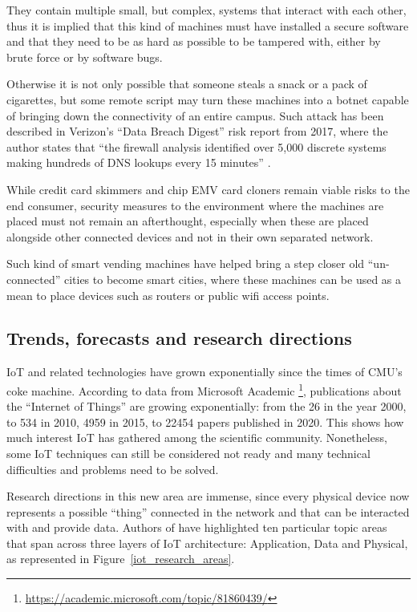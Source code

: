 			They contain multiple small, but complex, systems that interact with each other, thus it is implied that this kind of machines must have installed a secure software and that they need to be as hard as possible to be tampered with, either by brute force or by software bugs.
				
			Otherwise it is not only possible that someone steals a snack or a pack of cigarettes, but some remote script may turn these machines into a botnet capable of bringing down the connectivity of an entire campus.
			Such attack has been described in Verizon's ``Data Breach Digest'' risk report from 2017, where the author states that ``the firewall analysis identified over 5,000 discrete systems making hundreds of DNS lookups every 15 minutes'' \cite{DataBreachDigest}.
			
			While credit card skimmers and chip EMV card cloners remain viable risks to the end consumer, security measures to the environment where the machines are placed must not remain an afterthought, especially when these are placed alongside other connected devices and not in their own separated network.
			
			Such kind of smart vending machines have helped bring a step closer old ``un-connected'' cities to become smart cities, where these machines can be used as a mean to place devices such as routers or public wifi access points.
	
		\subsection{Trends, forecasts and research directions}
	
			IoT and related technologies have grown exponentially since the times of CMU's coke machine.
			According to data from Microsoft Academic \footnote{\url{https://academic.microsoft.com/topic/81860439/}}, publications about the ``Internet of Things'' are growing exponentially: from the 26 in the year 2000, to 534 in 2010, 4959 in 2015, to 22454 papers published in 2020.
			This shows how much interest IoT has gathered among the scientific community. Nonetheless, some IoT techniques can still be considered not ready and many technical difficulties and problems need to be solved.
	
			Research directions in this new area are immense, since every physical device now represents a possible ``thing'' connected in the network and that can be interacted with and provide data.
			Authors of \cite{9319033} have highlighted ten particular topic areas that span across three layers of IoT architecture: Application, Data and Physical, as represented in Figure~\ref{iot_research_areas}.
		
